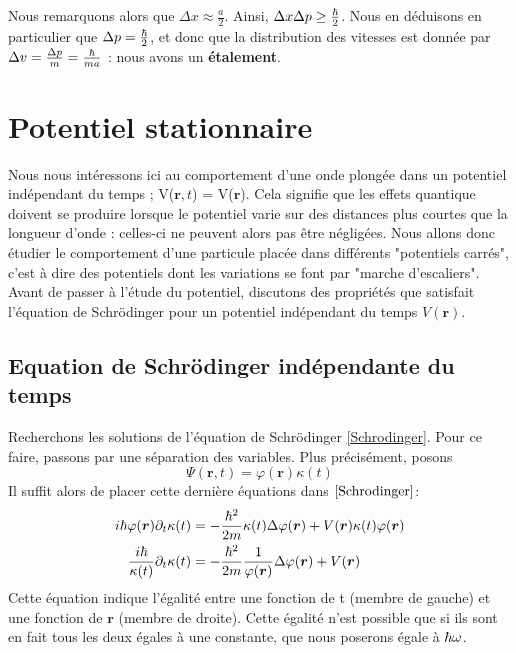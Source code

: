 \documentclass[../notesdecours]{subfiles}
\begin{document}

Nous remarquons alors que $\Delta x \approx \frac{a}{2}$. Ainsi, $\Delta x\Delta p \geq \frac{\hbar}{2}$. Nous en déduisons en particulier que $\Delta p = \frac{\hbar}{2}$, et donc que la distribution des vitesses est donnée par $\Delta v = \frac{\Delta p}{m} = \frac{\hbar}{ma}$ : nous avons un \textbf{étalement}.

\newpage
\section{Potentiel stationnaire}
Nous nous intéressons ici au comportement d'une onde plongée dans un potentiel indépendant du temps ; V($\bm{r},t$) = V($\bm{r}$). Cela signifie que les effets quantique doivent se produire lorsque le potentiel varie sur des distances plus courtes que la longueur d'onde : celles-ci ne peuvent alors pas être négligées.  Nous allons donc étudier le comportement d'une particule placée dans différents "potentiels carrés", c'est à dire des potentiels dont les variations se font par "marche d'escaliers". Avant de passer à l'étude du potentiel, discutons des propriétés que satisfait l'équation de Schrödinger pour un potentiel indépendant du temps $V(\bm{r})$.\\

\subsection{Equation de Schrödinger indépendante du temps}

Recherchons les solutions de l'équation de Schrödinger \eqref{Schrodinger}. Pour ce faire, passons par une séparation des variables. Plus précisément, posons
\begin{equation}
\Psi(\bm{r},t) = \varphi(\bm{r})\kappa(t)
\end{equation}
Il suffit alors de placer cette dernière équations dans $\eqref{Schrodinger}$:
\begin{align}
i \hbar \varphi(\bm{r})\partial_t \kappa(t) &= - \frac{\hbar^2}{2m} \kappa(t) \Delta \varphi(\bm{r}) + V(\bm{r})\kappa(t)\varphi(\bm{r})\\
\frac{i\hbar}{\kappa(t)} \partial_t \kappa(t) &= - \frac{\hbar^2}{2m} \frac{1}{\varphi(\bm{r})} \Delta \varphi(\bm{r}) + V(\bm{r})
\label{Séparation temporelle et spatiale}
\end{align}
Cette équation indique l'égalité entre une fonction de t (membre de gauche) et une fonction de $\bm{r}$ (membre de droite). Cette égalité n'est possible que si ils sont en fait tous les deux égales à une constante, que nous poserons égale à $\hbar \omega$.\\
\end{document}
